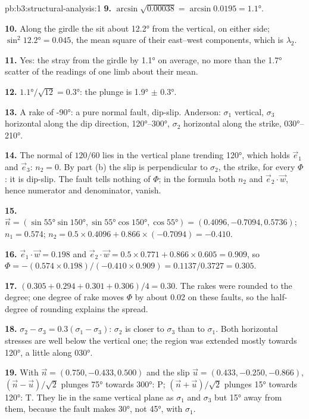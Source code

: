 \begin{solution}{pb:b3:structural-analysis:1}
\textbf{9.} $\arcsin\sqrt{0.00038} = \arcsin0.0195 = \ang{1.1}$.

\textbf{10.} Along the girdle the  sit about \ang{12.2} from the vertical,
on either side; $\sin^2\ang{12.2} = 0.045$, the mean square of their
east--west components, which is $\lambda_2$.

\textbf{11.} Yes: the  stray from the girdle by \ang{1.1} on average, no
more than the \ang{1.7} scatter of the readings of one limb about their mean.

\textbf{12.} $\ang{1.1}/\sqrt{12} = \ang{0.3}$: the plunge is \ang{1.9} $\pm$
\ang{0.3}.

\textbf{13.} A rake of \ang{-90}: a pure normal fault, dip-slip. Anderson:
$\sigma_1$ vertical, $\sigma_3$ horizontal along the dip direction,
\ang{120}--\ang{300}, $\sigma_2$ horizontal along the strike,
\ang{030}--\ang{210}.

\textbf{14.} The normal of $120/60$ lies in the vertical plane trending
\ang{120}, which holds $\vec e_1$ and $\vec e_3$: $n_2 = 0$. By part (b) the
slip is perpendicular to $\sigma_2$, the strike, for every $\Phi$: it is
dip-slip. The fault tells nothing of $\Phi$; in the formula both $n_2$ and
$\vec e_2\cdot\vec w$, hence numerator and denominator, vanish.

\textbf{15.} $\vec n = (\sin\ang{55}\sin\ang{150}, \sin\ang{55}\cos\ang{150},
\cos\ang{55}) = (0.4096, -0.7094, 0.5736)$; $n_1 = 0.574$; $n_2 = 0.5\times
0.4096 + 0.866\times(-0.7094) = -0.410$.

\textbf{16.} $\vec e_1\cdot\vec w = 0.198$ and $\vec e_2\cdot\vec w = 0.5\times
0.771 + 0.866\times0.605 = 0.909$, so $\Phi = -(0.574\times0.198)/(-0.410\times
0.909) = 0.1137/0.3727 = 0.305$.

\textbf{17.} $(0.305 + 0.294 + 0.301 + 0.306)/4 = 0.30$. The rakes were
rounded to the degree; one degree of rake moves $\Phi$ by about 0.02 on these
faults, so the half-degree of rounding explains the spread.

\textbf{18.} $\sigma_2 - \sigma_3 = 0.3(\sigma_1 - \sigma_3)$: $\sigma_2$ is
closer to $\sigma_3$ than to $\sigma_1$. Both horizontal stresses are well
below the vertical one; the region was extended mostly towards \ang{120}, a
little along \ang{030}.

\textbf{19.} With $\vec n = (0.750, -0.433, 0.500)$ and the slip $\vec u =
(0.433, -0.250, -0.866)$, $(\vec n - \vec u)/\sqrt2$ plunges \ang{75} towards
\ang{300}: P; $(\vec n + \vec u)/\sqrt2$ plunges \ang{15} towards \ang{120}:
T. They lie in the same vertical plane as $\sigma_1$ and $\sigma_3$ but
\ang{15} away from them, because the fault makes \ang{30}, not \ang{45}, with
$\sigma_1$.


\end{solution}
